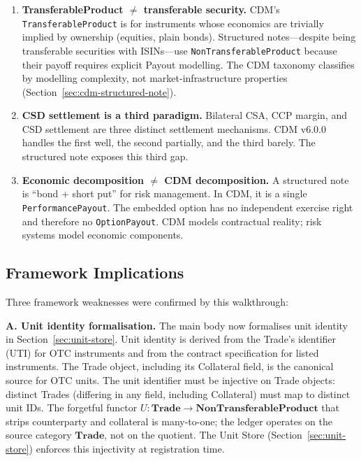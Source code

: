 \documentclass[11pt,a4paper]{article}
\begin{document}
\begin{enumerate}
\item \textbf{TransferableProduct $\neq$ transferable security.} CDM's \texttt{TransferableProduct} is for instruments whose economics are trivially implied by ownership (equities, plain bonds). Structured notes---despite being transferable securities with ISINs---use \texttt{NonTransferableProduct} because their payoff requires explicit Payout modelling. The CDM taxonomy classifies by modelling complexity, not market-infrastructure properties (Section~\ref{sec:cdm-structured-note}).

\item \textbf{CSD settlement is a third paradigm.} Bilateral CSA, CCP margin, and CSD settlement are three distinct settlement mechanisms. CDM v6.0.0 handles the first well, the second partially, and the third barely. The structured note exposes this third gap.

\item \textbf{Economic decomposition $\neq$ CDM decomposition.} A structured note is ``bond + short put'' for risk management. In CDM, it is a single \texttt{PerformancePayout}. The embedded option has no independent exercise right and therefore no \texttt{OptionPayout}. CDM models contractual reality; risk systems model economic components.
\end{enumerate}

\subsection{Framework Implications}
\label{sec:cdm-implications}

Three framework weaknesses were confirmed by this walkthrough:

\medskip
\noindent\textbf{A. Unit identity formalisation.}
The main body now formalises unit identity in Section~\ref{sec:unit-store}. Unit identity is derived from the Trade's identifier (UTI) for OTC instruments and from the contract specification for listed instruments. The Trade object, including its Collateral field, is the canonical source for OTC units. The unit identifier must be injective on Trade objects: distinct Trades (differing in any field, including Collateral) must map to distinct unit IDs. The forgetful functor $U : \mathbf{Trade} \to \mathbf{NonTransferableProduct}$ that strips counterparty and collateral is many-to-one; the ledger operates on the source category $\mathbf{Trade}$, not on the quotient. The Unit Store (Section~\ref{sec:unit-store}) enforces this injectivity at registration time.
\end{document}
